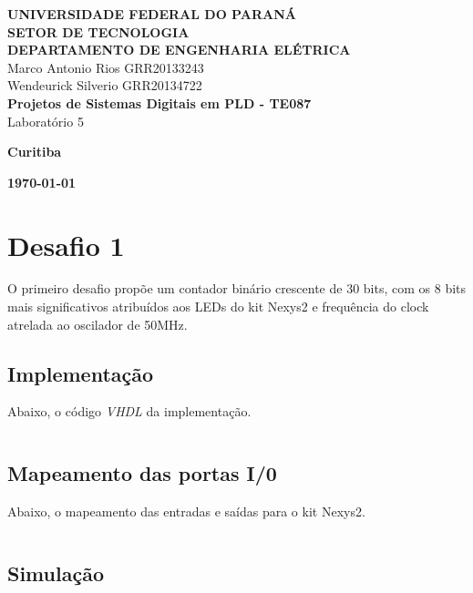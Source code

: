 \documentclass[12pt]{article}
\begin{document}
    
\begin{titlepage}
 \vfill
  \begin{center}
   {\large \textbf{UNIVERSIDADE FEDERAL DO PARANÁ \\ SETOR DE TECNOLOGIA \\ DEPARTAMENTO DE ENGENHARIA ELÉTRICA}} \\[5cm]

  {\large {Marco Antonio Rios  GRR20133243 \\ Wendeurick Silverio GRR20134722} }\\[4cm]


   {\Large \textbf{Projetos de Sistemas Digitais em PLD - TE087} \\ Laboratório 5}\\[6cm]
    \vfill

    \vspace{2cm}

    \large \textbf{Curitiba}

    \large \textbf{\today}

      \end{center}
\end{titlepage}

\clearpage

\section{Desafio 1}
O primeiro desafio propõe um contador binário crescente de 30 bits, com os 8 bits mais significativos atribuídos aos LEDs do kit Nexys2 e frequência do clock atrelada ao oscilador de 50MHz.

\subsection{Implementação}

Abaixo, o código \emph{VHDL} da implementação.

\inputminted{vhdl}{desafio1.vhd}

\subsection{Mapeamento das portas I/0}

Abaixo, o mapeamento das entradas e saídas para o kit Nexys2.

\inputminted{vhdl}{pins_desafio1.ucf}

\subsection{Simulação}
\end{document}
